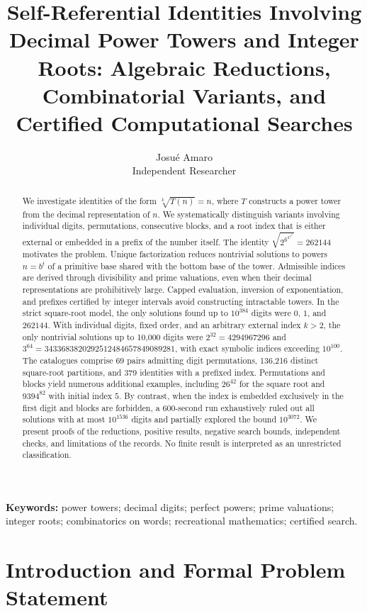 \documentclass[11pt,a4paper]{article}
\title{Self-Referential Identities Involving Decimal Power Towers and Integer Roots: Algebraic Reductions, Combinatorial Variants, and Certified Computational Searches}
\author{Josué Amaro \\ \small Independent Researcher}
\date{}
\begin{document}
\maketitle

\begin{abstract}

We investigate identities of the form $\sqrt[k]{T(n)}=n$, where $T$ constructs a power tower from the decimal representation of $n$. We systematically distinguish variants involving individual digits, permutations, consecutive blocks, and a root index that is either external or embedded in a prefix of the number itself. The identity $\sqrt{2^{6^{2^{1^{4^4}}}}}=262144$ motivates the problem. Unique factorization reduces nontrivial solutions to powers $n=b^t$ of a primitive base shared with the bottom base of the tower. Admissible indices are derived through divisibility and prime valuations, even when their decimal representations are prohibitively large. Capped evaluation, inversion of exponentiation, and prefixes certified by integer intervals avoid constructing intractable towers. In the strict square-root model, the only solutions found up to $10^{384}$ digits were $0$, $1$, and $262144$. With individual digits, fixed order, and an arbitrary external index $k>2$, the only nontrivial solutions up to 10,000 digits were $2^{32}=4294967296$ and $3^{64}=3433683820292512484657849089281$, with exact symbolic indices exceeding $10^{100}$. The catalogues comprise 69 pairs admitting digit permutations, 136,216 distinct square-root partitions, and 379 identities with a prefixed index. Permutations and blocks yield numerous additional examples, including $26^{42}$ for the square root and $9394^{82}$ with initial index $5$. By contrast, when the index is embedded exclusively in the first digit and blocks are forbidden, a 600-second run exhaustively ruled out all solutions with at most $10^{1536}$ digits and partially explored the bound $10^{3072}$. We present proofs of the reductions, positive results, negative search bounds, independent checks, and limitations of the records. No finite result is interpreted as an unrestricted classification.

\end{abstract}
\noindent \textbf{Keywords:} power towers; decimal digits; perfect powers; prime valuations; integer roots; combinatorics on words; recreational mathematics; certified search.

\tableofcontents
\clearpage

\section{Introduction and Formal Problem Statement}
\end{document}
